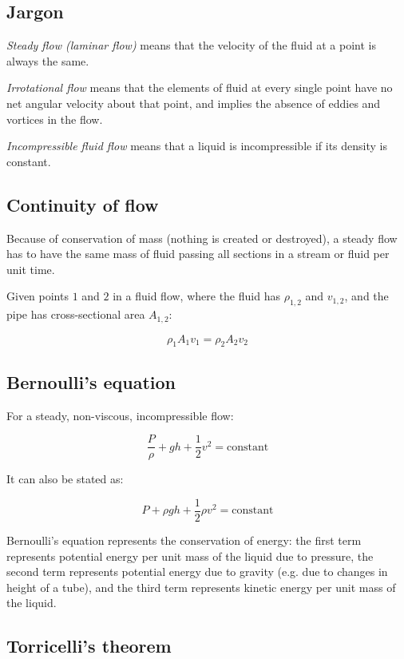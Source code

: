 \documentclass[12pt]{article}
\begin{document}
\subsection{Jargon}

\emph{Steady flow (laminar flow)} means that the velocity of the fluid at a point is always the same.

\emph{Irrotational flow} means that the elements of fluid at every single point have no net angular velocity about that point, and implies the absence of eddies and vortices in the flow.

\emph{Incompressible fluid flow} means that a liquid is incompressible if its density is constant.

\subsection{Continuity of flow}

Because of conservation of mass (nothing is created or destroyed), a steady flow has to have the same mass of fluid passing all sections in a stream or fluid per unit time.

Given points $1$ and $2$ in a fluid flow, where the fluid has $\rho_{1,2}$ and $v_{1,2}$, and the pipe has cross-sectional area $A_{1,2}$:

\[
\boxed{
\rho_1 A_1 v_1 = \rho_2 A_2 v_2
}
\]

\subsection{Bernoulli's equation}

For a steady, non-viscous, incompressible flow:

\[
\boxed{
\frac{P}{\rho} + gh + \frac{1}{2}v^2 = \text{constant}
}
\]

It can also be stated as:

\[
\boxed{
P + \rho g h + \frac{1}{2}\rho v^2 = \text{constant}
}
\]

Bernoulli's equation represents the conservation of energy: the first term represents potential energy per unit mass of the liquid due to pressure, the second term represents potential energy due to gravity (e.g. due to changes in height of a tube), and the third term represents kinetic energy per unit mass of the liquid.

\newpage

\subsection{Torricelli's theorem}
\end{document}
